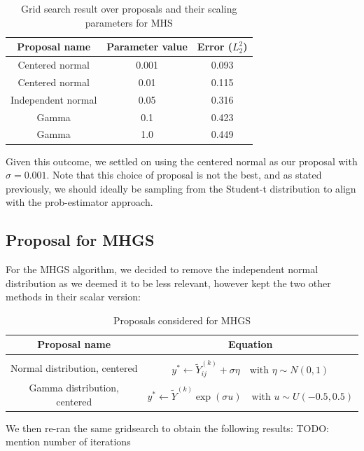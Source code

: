 \documentclass[12pt]{memoir}
\begin{document}
\begin{table}[H]

    \begin{center}
        \begin{tabular}{|c|c|c|}
            \hline
            Proposal name & Parameter value & Error ($L_2^2$)\\
            \hline\hline
            Centered normal& 0.001 & 0.093\\
            Centered normal&0.01  &0.115\\
            Independent normal& 0.05 &0.316\\
            Gamma&0.1  &0.423\\
            Gamma&1.0   &0.449\\\hline
        \end{tabular}
\end{center}
\caption{Grid search result over proposals and their scaling parameters for MHS}
\label{table:proposal-grid-search-mhs}
\end{table}
Given this outcome, we settled on using the centered normal as our proposal with $\sigma=0.001$. Note that this choice of proposal is not the best, and as stated previously, we should ideally be sampling from the Student-t distribution to align with the prob-estimator approach. 

\subsection*{Proposal for MHGS}
For the MHGS algorithm, we decided to remove the independent normal distribution as we deemed it to be less relevant, however kept the two other methods in their scalar version:

\begin{table}[H]

    \begin{center}
        \begin{tabular}{|c|c|}
            \hline
            Proposal name & Equation\\
            \hline\hline
             & \\[-10pt]
            Normal distribution, centered & $y^* \gets \tilde Y^{(k)}_{ij} + \sigma {\eta} \quad\text{with } \eta \sim N(0,1)$\\
            Gamma distribution, centered & $y^* \gets \tilde Y^{(k)} \exp (\sigma u)\quad \text{with } {u} \sim U(-0.5, 0.5)$\\\hline
        \end{tabular}
\end{center}
\caption{Proposals considered for MHGS}
\label{table:proposal-comp-mhgs}
\end{table}
We then re-ran the same gridsearch to obtain the following results: TODO: mention number of iterations
\end{document}

